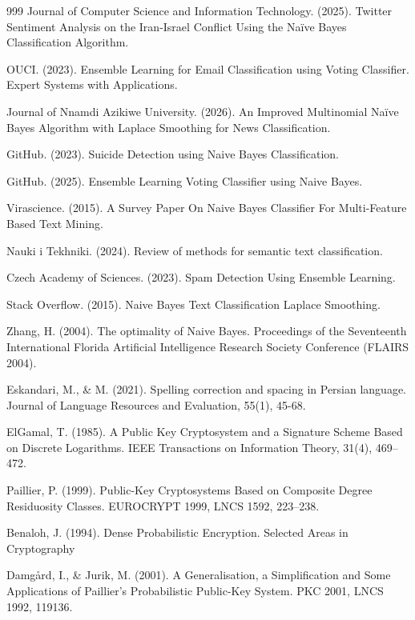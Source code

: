 \begin{thebibliography}{999}
 Journal of Computer Science and Information Technology. (2025). Twitter Sentiment Analysis on the Iran-Israel Conflict Using the Naïve Bayes Classification Algorithm.

 OUCI. (2023). Ensemble Learning for Email Classification using Voting Classifier. Expert Systems with Applications.

 Journal of Nnamdi Azikiwe University. (2026). An Improved Multinomial Naïve Bayes Algorithm with Laplace Smoothing for News Classification.

 GitHub. (2023). Suicide Detection using Naive Bayes Classification.

 GitHub. (2025). Ensemble Learning Voting Classifier using Naive Bayes.

 Virascience. (2015). A Survey Paper On Naive Bayes Classifier For Multi-Feature Based Text Mining.

 Nauki i Tekhniki. (2024). Review of methods for semantic text classification.

 Czech Academy of Sciences. (2023). Spam Detection Using Ensemble Learning.

 Stack Overflow. (2015). Naive Bayes Text Classification Laplace Smoothing.

 Zhang, H. (2004). The optimality of Naive Bayes. Proceedings of the Seventeenth International Florida Artificial Intelligence Research Society Conference (FLAIRS 2004).

 Eskandari, M., \& M. (2021). Spelling correction and spacing in Persian language. Journal of Language Resources and Evaluation, 55(1), 45-68.

 ElGamal, T. (1985). A Public Key Cryptosystem and a Signature Scheme Based on Discrete Logarithms. IEEE Transactions on Information Theory, 31(4), 469–472.

 Paillier, P. (1999). Public-Key Cryptosystems Based on Composite Degree Residuosity Classes. EUROCRYPT 1999, LNCS 1592, 223–238.

 Benaloh, J. (1994). Dense Probabilistic Encryption. Selected Areas in Cryptography

 Damgård, I., \& Jurik, M. (2001). A Generalisation, a Simplification and Some Applications of Paillier’s Probabilistic Public-Key System. PKC 2001, LNCS 1992, 119\lr{--}136.


\end{thebibliography}
